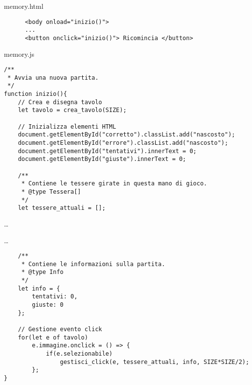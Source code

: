 \begin{frame}[fragile]\transfade
  \begin{sol}\centering
    memory.html
    \begin{verbatim}
      <body onload="inizio()">
      ...
      <button onclick="inizio()"> Ricomincia </button>
    \end{verbatim}
  \end{sol}
\end{frame}

\begin{frame}[fragile]\transfade
  \begin{sol}\centering
    memory.js
    \begin{verbatim}
/**
 * Avvia una nuova partita.
 */
function inizio(){
    // Crea e disegna tavolo
    let tavolo = crea_tavolo(SIZE);

    // Inizializza elementi HTML
    document.getElementById("corretto").classList.add("nascosto");
    document.getElementById("errore").classList.add("nascosto");
    document.getElementById("tentativi").innerText = 0;
    document.getElementById("giuste").innerText = 0;

    /**
     * Contiene le tessere girate in questa mano di gioco.
     * @type Tessera[]
     */
    let tessere_attuali = [];

    \end{verbatim}
    \dots
  \end{sol}
\end{frame}
\begin{frame}[fragile]\transfade
  \begin{sol}\centering
    \dots
    \begin{verbatim}
    /**
     * Contiene le informazioni sulla partita.
     * @type Info
     */
    let info = {
        tentativi: 0,
        giuste: 0
    };

    // Gestione evento click
    for(let e of tavolo)
        e.immagine.onclick = () => {
            if(e.selezionabile)
                gestisci_click(e, tessere_attuali, info, SIZE*SIZE/2);
        };
}
    \end{verbatim}
  \end{sol}
\end{frame}
